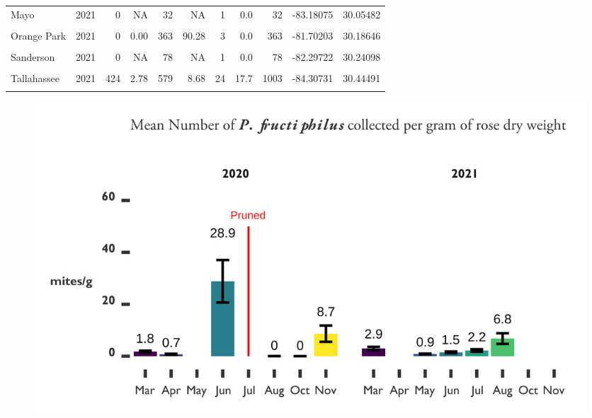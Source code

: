 \documentclass[12pt,final,CPage]{ufthesis}
\begin{document}
{\begin{table}[!h]
{\begin{tabular}[t]{lrrrrrrrrrr}
  Mayo & 2021 & 0 & NA & 32 & NA & 1 & 0.0 & 32 & -83.18075 & 30.05482\\
  \cellcolor{gray!6}{Monticello} & \cellcolor{gray!6}{2021} & \cellcolor{gray!6}{0} & \cellcolor{gray!6}{NA} & \cellcolor{gray!6}{20} & \cellcolor{gray!6}{NA} & \cellcolor{gray!6}{1} & \cellcolor{gray!6}{0.0} & \cellcolor{gray!6}{20} & \cellcolor{gray!6}{-83.87114} & \cellcolor{gray!6}{30.54514}\\
  \addlinespace
  Orange Park & 2021 & 0 & 0.00 & 363 & 90.28 & 3 & 0.0 & 363 & -81.70203 & 30.18646\\
  \cellcolor{gray!6}{Perry} & \cellcolor{gray!6}{2021} & \cellcolor{gray!6}{0} & \cellcolor{gray!6}{NA} & \cellcolor{gray!6}{3} & \cellcolor{gray!6}{NA} & \cellcolor{gray!6}{1} & \cellcolor{gray!6}{0.0} & \cellcolor{gray!6}{3} & \cellcolor{gray!6}{-83.57833} & \cellcolor{gray!6}{30.11150}\\
  Sanderson & 2021 & 0 & NA & 78 & NA & 1 & 0.0 & 78 & -82.29722 & 30.24098\\
  \cellcolor{gray!6}{Sneads} & \cellcolor{gray!6}{2021} & \cellcolor{gray!6}{0} & \cellcolor{gray!6}{NA} & \cellcolor{gray!6}{1} & \cellcolor{gray!6}{NA} & \cellcolor{gray!6}{1} & \cellcolor{gray!6}{0.0} & \cellcolor{gray!6}{1} & \cellcolor{gray!6}{-84.91279} & \cellcolor{gray!6}{30.71067}\\
  Tallahassee & 2021 & 424 & 2.78 & 579 & 8.68 & 24 & 17.7 & 1003 & -84.30731 & 30.44491\\
  \addlinespace
  \cellcolor{gray!6}{Grand Totals} & \cellcolor{gray!6}{2021} & \cellcolor{gray!6}{8679} & \cellcolor{gray!6}{NA} & \cellcolor{gray!6}{4674} & \cellcolor{gray!6}{NA} & \cellcolor{gray!6}{425} & \cellcolor{gray!6}{127.9} & \cellcolor{gray!6}{13353} & \cellcolor{gray!6}{-83.71379} & \cellcolor{gray!6}{30.25158}\\
  \bottomrule
  \end{tabular}}
  \end{table}
  \begin{figure}[h]

  {\centering \includegraphics[width=1\linewidth]{figure/rrv_pheno_bargraph} 

}
\end{figure}}
\end{document}
